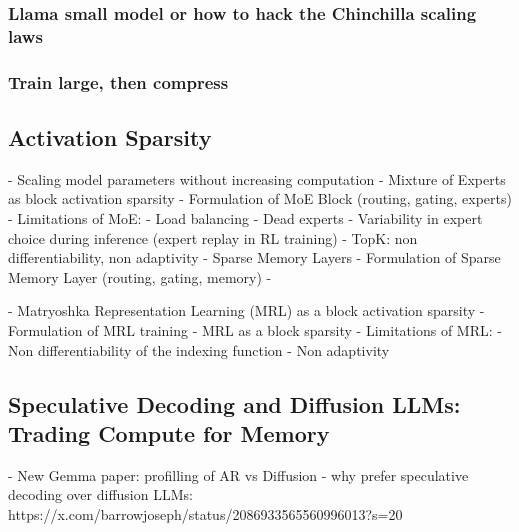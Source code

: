 \subsubsection{Llama small model or how to hack the Chinchilla scaling laws}
\subsubsection{Train large, then compress}
\subsection{Activation Sparsity}
- Scaling model parameters without increasing computation
- Mixture of Experts as block activation sparsity
    - Formulation of MoE Block (routing, gating, experts)
    - Limitations of MoE:
        - Load balancing
        - Dead experts
        - Variability in expert choice during inference (expert replay in RL training)
        - TopK: non differentiability, non adaptivity
- Sparse Memory Layers
    - Formulation of Sparse Memory Layer (routing, gating, memory)
    - 

- Matryoshka Representation Learning (MRL) as a block activation sparsity
    - Formulation of MRL training
    - MRL as a block sparsity
    - Limitations of MRL:
        - Non differentiability of the indexing function
        - Non adaptivity
\subsection{Speculative Decoding and Diffusion LLMs: Trading Compute for Memory}
- New Gemma paper: profilling of AR vs Diffusion
- why prefer speculative decoding over diffusion LLMs: https://x.com/barrowjoseph/status/2086933565560996013?s=20